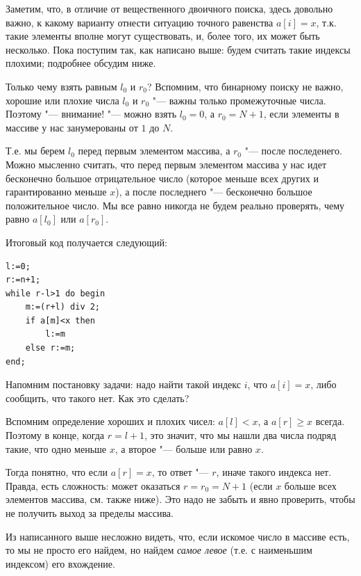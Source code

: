 \documentclass[a4paper,10pt]{problems}
\begin{document}
Заметим, что, в отличие от вещественного двоичного поиска, здесь довольно важно, к какому варианту 
отнести ситуацию точного равенства $a[i]=x$, т.к. такие элементы вполне могут существовать,
и, более того, их может быть несколько.
Пока поступим так, как написано выше: будем считать такие индексы плохими;
подробнее обсудим ниже.

Только чему взять равным $l_0$ и $r_0$?
Вспомним, что бинарному поиску не важно, хорошие или плохие числа $l_0$ и $r_0$ "---
важны только промежуточные числа. 
Поэтому "--- внимание! "--- можно взять $l_0=0$, а $r_0=N+1$, если элементы в массиве
у нас занумерованы от $1$ до $N$. 

Т.е. мы берем $l_0$ перед первым элементом массива, а $r_0$ "--- после последенего.
Можно мысленно считать, что перед первым элементом массива у нас идет бесконечно большое отрицательное число
(которое меньше всех других и гарантированно меньше $x$), а после последнего "---
бесконечно большое положительное число.
Мы все равно никогда не будем реально проверять, чему равно $a[l_0]$ или $a[r_0]$.

Итоговый код получается следующий:
\begin{codesampleo}\begin{verbatim}
l:=0;
r:=n+1;  
while r-l>1 do begin    
    m:=(r+l) div 2;
    if a[m]<x then
        l:=m
    else r:=m;
end;
\end{verbatim}
\end{codesampleo}

Напомним постановку задачи: надо найти такой индекс $i$, что $a[i]=x$, либо сообщить,
что такого нет. Как это сделать?

Вспомним определение хороших и плохих чисел: $a[l]<x$, а $a[r]\geq x$ всегда.
Поэтому в конце, когда $r=l+1$, это значит, что мы нашли два числа подряд такие,
что одно меньше $x$, а второе "--- больше или равно $x$.

Тогда понятно, что если $a[r]=x$, то ответ "--- $r$, иначе такого индекса нет.
Правда, есть сложность: может оказаться $r=r_0=N+1$ (если $x$ больше всех элементов массива, см. также ниже). 
Это надо не забыть и явно проверить, чтобы не получить выход за пределы массива.

Из написанного выше несложно видеть, что, если искомое число в массиве есть, то мы не просто его найдем,
но найдем \textit{самое левое} (т.е. с наименьшим индексом) его вхождение.
\end{document}

